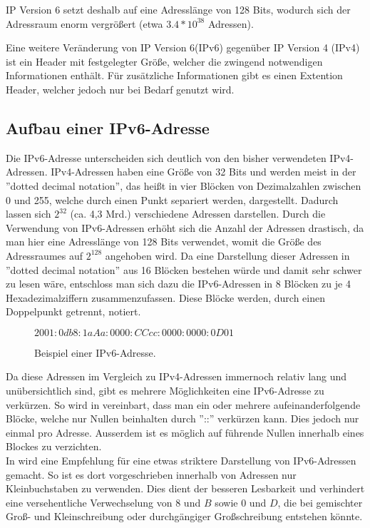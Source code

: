 \documentclass[a4paper, 12pt]{scrartcl}
\begin{document}
IP Version 6 setzt deshalb auf eine Adresslänge von 128 Bits, wodurch sich der Adressraum enorm vergrößert (etwa $3.4*10^{38}$ Adressen). 

Eine weitere Veränderung von IP Version 6(IPv6) gegenüber IP Version 4 (IPv4) ist ein Header mit festgelegter Größe, welcher die zwingend notwendigen Informationen enthält. Für zusätzliche Informationen gibt es einen Extention Header, welcher jedoch nur bei Bedarf genutzt wird.

\subsection{Aufbau einer IPv6-Adresse}
Die IPv6-Adresse unterscheiden sich deutlich von den bisher verwendeten IPv4-Adressen. IPv4-Adressen haben eine Größe von 32 Bits und werden meist in der ''dotted decimal notation'', das heißt in vier Blöcken von Dezimalzahlen zwischen 0 und 255, welche durch einen Punkt separiert werden, dargestellt. Dadurch lassen sich $2^{32}$ (ca. 4,3 Mrd.) verschiedene Adressen darstellen.
Durch die Verwendung von IPv6-Adressen erhöht sich die Anzahl der Adressen drastisch, da man hier eine Adresslänge von 128 Bits verwendet, womit die Größe des Adressraumes auf $2^{128}$ angehoben wird. Da eine Darstellung dieser Adressen in ''dotted decimal notation'' aus 16 Blöcken bestehen würde und damit sehr schwer zu lesen wäre, entschloss man sich dazu die IPv6-Adressen in 8 Blöcken zu je 4 Hexadezimalziffern zusammenzufassen. Diese Blöcke werden, durch einen Doppelpunkt getrennt, notiert.


\begin{figure}[h]
	\centering
	$2001:0db8:1aAa:0000:CCcc:0000:0000:0D01$
	\caption{Beispiel einer IPv6-Adresse.}
\end{figure}


Da diese Adressen im Vergleich zu IPv4-Adressen immernoch relativ lang und unübersichtlich sind, gibt es mehrere Möglichkeiten eine IPv6-Adresse zu verkürzen.
So wird in \cite{rfc4291} vereinbart, dass man ein oder mehrere aufeinanderfolgende Blöcke, welche nur Nullen beinhalten durch ''::'' verkürzen kann. Dies jedoch nur einmal pro Adresse.
Ausserdem ist es möglich auf führende Nullen innerhalb eines Blockes zu verzichten. \\


In \cite{rfc5952} wird eine Empfehlung für eine etwas striktere Darstellung von IPv6-Adressen gemacht.
So ist es dort vorgeschrieben innerhalb von Adressen nur Kleinbuchstaben zu verwenden. Dies dient der besseren Lesbarkeit und verhindert eine versehentliche Verwechselung von $8$ und $B$ sowie $0$ und $D$, die bei gemischter Groß- und Kleinschreibung oder durchgängiger Großschreibung entstehen könnte.
\end{document}
